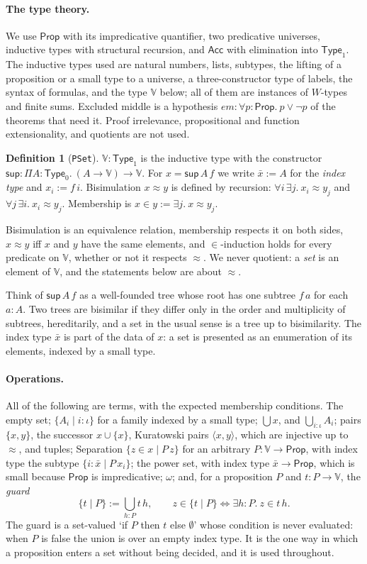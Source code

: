 \documentclass[10pt]{article}
\theoremstyle{definition}
\newtheorem{definition}[theorem]{Definition}
\theoremstyle{remark}
\newcommand{\Prop}{\mathsf{Prop}}
\newcommand{\Type}{\mathsf{Type}}
\newcommand{\Acc}{\mathsf{Acc}}
\newcommand{\V}{\mathbb{V}}
\newcommand{\lean}[1]{\texttt{#1}}
\newcommand{\guard}[2]{\{#1\mid #2\}}
\begin{document}
\paragraph{The type theory.}
We use $\Prop$ with its impredicative quantifier, two predicative
universes, inductive types with structural recursion, and $\Acc$ with
elimination into $\Type_1$. The inductive types used are natural numbers,
lists, subtypes, the lifting of a proposition or a small type to a
universe, a three-constructor type of labels, the syntax of formulas,
and the type $\V$ below; all of them are instances of $W$-types and
finite sums. Excluded middle is a hypothesis
$\mathit{em}:\forall p{:}\Prop.\ p\vee\neg p$ of the theorems that need
it. Proof irrelevance, propositional and function extensionality, and
quotients are not used.

\begin{definition}[\lean{PSet}]
$\V:\Type_1$ is the inductive type with the constructor
$\mathsf{sup}:\Pi A{:}\Type_0.\ (A\to\V)\to\V$. For $x=\mathsf{sup}\,A\,f$ we write
$\bar x:=A$ for the \emph{index type} and $x_i:=f\,i$. Bisimulation
$x\approx y$ is defined by recursion:
$\forall i\,\exists j.\ x_i\approx y_j$ and $\forall j\,\exists i.\ x_i\approx y_j$.
Membership is $x\in y:=\exists j.\ x\approx y_j$.
\end{definition}

Bisimulation is an equivalence relation, membership respects it on both
sides, $x\approx y$ iff $x$ and $y$ have the same elements, and
$\in$-induction holds for every predicate on $\V$, whether or not it
respects $\approx$. We never quotient: a \emph{set} is an element of $\V$,
and the statements below are about $\approx$.

Think of $\mathsf{sup}\,A\,f$ as a well-founded tree whose root has one
subtree $f\,a$ for each $a:A$. Two trees are bisimilar if they differ
only in the order and multiplicity of subtrees, hereditarily, and a set
in the usual sense is a tree up to bisimilarity. The index type $\bar x$
is part of the data of $x$: a set is presented as an enumeration of its
elements, indexed by a small type.

\paragraph{Operations.}
All of the following are terms, with the expected membership
conditions. The empty set; $\{A_i\mid i:\iota\}$ for a family indexed
by a small type; $\bigcup x$, and $\bigcup_{i:\iota}A_i$; pairs
$\{x,y\}$, the successor $x\cup\{x\}$, Kuratowski pairs $\langle x,y\rangle$, which
are injective up to $\approx$, and tuples; Separation
$\{z\in x\mid P\,z\}$ for an arbitrary $P:\V\to\Prop$, with index type the
subtype $\{i:\bar x\mid P\,x_i\}$; the power set, with index type
$\bar x\to\Prop$, which is small because $\Prop$ is impredicative;
$\omega$; and, for a proposition $P$ and $t:P\to\V$, the \emph{guard}
\[\guard tP:=\textstyle\bigcup_{h:P}t\,h,\qquad
z\in\guard tP\iff\exists h{:}P.\ z\in t\,h.\]
The guard is a set-valued `if $P$ then $t$ else $\emptyset$' whose condition is
never evaluated: when $P$ is false the union is over an empty index
type. It is the one way in which a proposition enters a set without
being decided, and it is used throughout.
\end{document}
